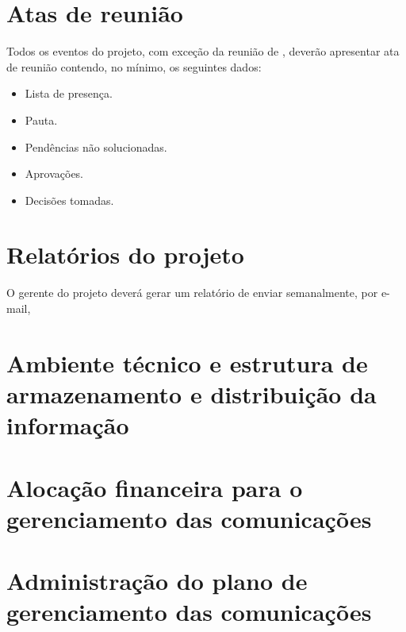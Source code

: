 
\section{Atas de reunião}

Todos os eventos do projeto, com exceção da reunião de , deverão apresentar ata de reunião contendo, no mínimo, os seguintes dados:

\begin{itemize}
\item Lista de presença.
\item Pauta.
\item Pendências não solucionadas.
\item Aprovações.
\item Decisões tomadas.
\end{itemize}


\section{Relatórios do projeto}

O gerente do projeto deverá gerar um relatório de enviar semanalmente, por e-mail, 


\section{Ambiente técnico e estrutura de armazenamento e distribuição da informação}




\section{Alocação financeira para o gerenciamento das comunicações}


\section{Administração do plano de gerenciamento das comunicações}

